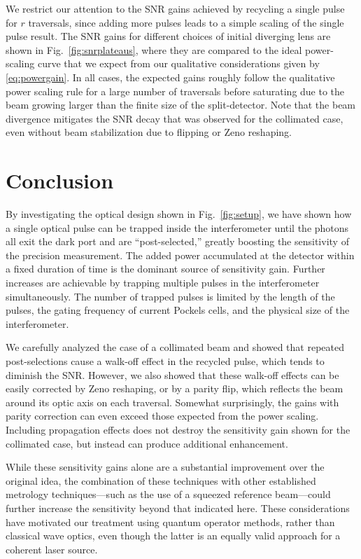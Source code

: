 We restrict our attention to the SNR gains achieved by recycling a single pulse for $r$ traversals, since adding more pulses leads to a simple scaling of the single pulse result. The SNR gains for different choices of initial diverging lens are shown in Fig.~\ref{fig:snrplateaus}, where they are compared to the ideal power-scaling curve that we expect from our qualitative considerations given by \eqref{eq:powergain}.  In all cases, the expected gains roughly follow the qualitative power scaling rule for a large number of traversals before saturating due to the beam growing larger than the finite size of the split-detector.  Note that the beam divergence mitigates the SNR decay that was observed for the collimated case, even without beam stabilization due to flipping or Zeno reshaping.

\section{Conclusion}\label{sec:conclusion}
By investigating the optical design shown in Fig.~\ref{fig:setup}, we have shown how a single optical pulse can be trapped inside the interferometer until the photons all exit the dark port and are ``post-selected,'' greatly boosting the sensitivity of the precision measurement.  The added power accumulated at the detector within a fixed duration of time is the dominant source of sensitivity gain.  Further increases are achievable by trapping multiple pulses in the interferometer simultaneously.  The number of trapped pulses is limited by the length of the pulses, the gating frequency of current Pockels cells, and the physical size of the interferometer.

We carefully analyzed the case of a collimated beam and showed that repeated post-selections cause a walk-off effect in the recycled pulse, which tends to diminish the SNR.  However, we also showed that these walk-off effects can be easily corrected by Zeno reshaping, or by a parity flip, which reflects the beam around its optic axis on each traversal.  Somewhat surprisingly, the gains with parity correction can even exceed those expected from the power scaling.  Including propagation effects does not destroy the sensitivity gain shown for the collimated case, but instead can produce additional enhancement.  

While these sensitivity gains alone are a substantial improvement over the original idea, the combination of these techniques with other established metrology techniques---such as the use of a squeezed reference beam---could further increase the sensitivity beyond that indicated here.  These considerations have motivated our treatment using quantum operator methods, rather than classical wave optics, even though the latter is an equally valid approach for a coherent laser source.

